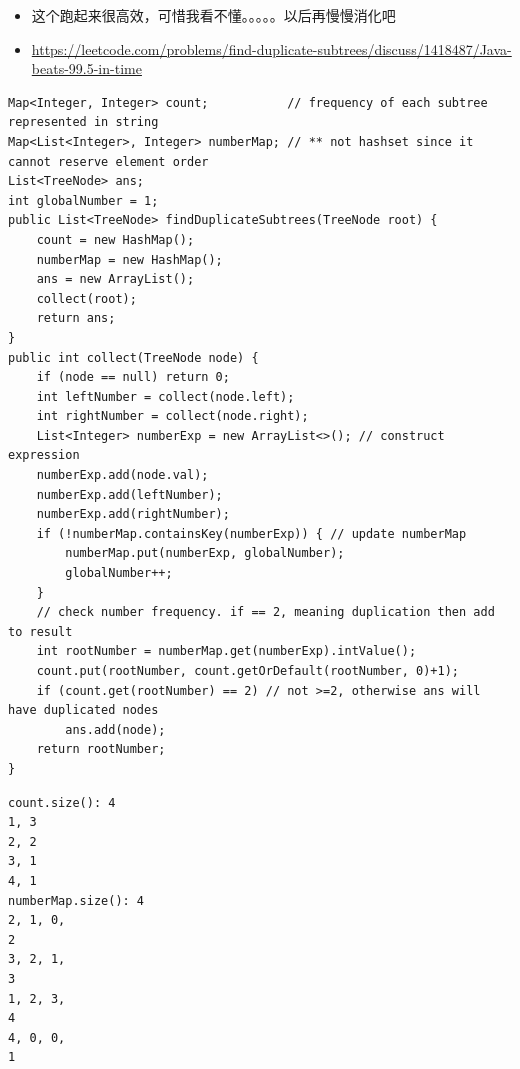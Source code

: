 \documentclass[9pt, b5paaper]{book}
\begin{document}
\begin{itemize}
\item 这个跑起来很高效，可惜我看不懂。。。。。以后再慢慢消化吧
\item \url{https://leetcode.com/problems/find-duplicate-subtrees/discuss/1418487/Java-beats-99.5-in-time}
\end{itemize}
\begin{verbatim}
Map<Integer, Integer> count;           // frequency of each subtree represented in string
Map<List<Integer>, Integer> numberMap; // ** not hashset since it cannot reserve element order
List<TreeNode> ans;
int globalNumber = 1;
public List<TreeNode> findDuplicateSubtrees(TreeNode root) {
    count = new HashMap();
    numberMap = new HashMap();
    ans = new ArrayList();
    collect(root);
    return ans;
}
public int collect(TreeNode node) {
    if (node == null) return 0;
    int leftNumber = collect(node.left);
    int rightNumber = collect(node.right);
    List<Integer> numberExp = new ArrayList<>(); // construct expression
    numberExp.add(node.val);
    numberExp.add(leftNumber);
    numberExp.add(rightNumber);
    if (!numberMap.containsKey(numberExp)) { // update numberMap
        numberMap.put(numberExp, globalNumber);
        globalNumber++;
    }
    // check number frequency. if == 2, meaning duplication then add to result
    int rootNumber = numberMap.get(numberExp).intValue();
    count.put(rootNumber, count.getOrDefault(rootNumber, 0)+1);
    if (count.get(rootNumber) == 2) // not >=2, otherwise ans will have duplicated nodes
        ans.add(node);
    return rootNumber;
}
\end{verbatim}
\begin{verbatim}
count.size(): 4
1, 3
2, 2
3, 1
4, 1
numberMap.size(): 4
2, 1, 0,
2
3, 2, 1,
3
1, 2, 3,
4
4, 0, 0,
1
\end{verbatim}
\end{document}
